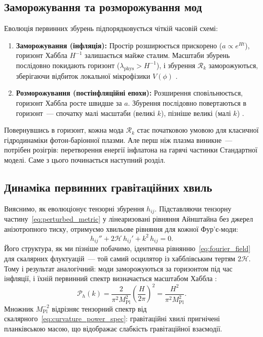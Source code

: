 \documentclass[12pt, a4paper]{article}
\begin{document}
\subsection{Заморожування та розморожування мод}

Еволюція первинних збурень підпорядковується чіткій часовій
схемі:
\begin{enumerate}
  \item \textbf{Заморожування (інфляція):} Простір розширюється
        прискорено ($a \propto e^{Ht}$), горизонт Хаббла
        $H^{-1}$ залишається майже сталим. Масштаби збурень
        послідовно покидають горизонт ($\lambda_\mathrm{phys} >
        H^{-1}$), і збурення $\mathcal{R}_k$ заморожуються,
        зберігаючи відбиток локальної мікрофізики $V(\phi)$
        \cite{bardeen_1980}.
  \item \textbf{Розморожування (постінфляційні епохи):}
        Розширення сповільнюється, горизонт Хаббла росте
        швидше за $a$. Збурення послідовно повертаються в
        горизонт~--- спочатку малі масштаби (великі $k$),
        пізніше великі (малі $k$) \cite{mukhanov_2005}.
\end{enumerate}

Повернувшись в горизонт, кожна мода $\mathcal{R}_k$ стає
початковою умовою для класичної гідродинаміки фотон-баріонної
плазми. Але перш ніж плазма виникне~--- потрібен розігрів:
перетворення енергії інфлатона на гарячі частинки Стандартної
моделі. Саме з цього починається наступний розділ.

\subsection{Динаміка первинних гравітаційних хвиль}

Вияснимо, як еволюціонує тензорні збурення $h_{ij}$. Підставляючи тензорну
частину~\eqref{eq:perturbed_metric} у лінеаризовані рівняння
Айнштайна без джерел анізотропного тиску, отримуємо хвильове
рівняння для кожної Фур'є-моди:
\begin{equation}\label{eq:tensor_wave_eq}
  h_{ij}'' + 2\mathcal{H}\,h_{ij}' + k^2\,h_{ij} = 0.
\end{equation}
Його структура, як ми пізніше побачимо, ідентична рівнянню~\eqref{eq:fourier_field}
для скалярних флуктуацій~--- той самий осцилятор із
хабблівським тертям $2\mathcal{H}$. Тому і результат
аналогічний: моди заморожуються за горизонтом під час
інфляції, і їхній первинний спектр визначається масштабом
Хаббла \cite{starobinsky_1979}:
\begin{equation}\label{eq:tensor_power_spec}
  \mathcal{P}_h(k)
    = \frac{2}{\pi^2 M_\mathrm{Pl}^2}
      \left(\frac{H}{2\pi}\right)^{\!2}
    = \frac{H^2}{\pi^2 M_\mathrm{Pl}^2}.
\end{equation}
Множник $M_\mathrm{Pl}^{-2}$ відрізняє тензорний спектр від
скалярного~\eqref{eq:curvature_power_spec}: гравітаційні хвилі
пригнічені планківською масою, що відображає слабкість
гравітаційної взаємодії.
\end{document}
